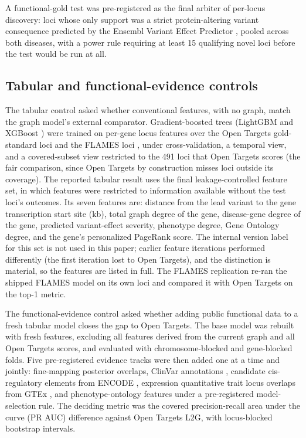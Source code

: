 \documentclass[11pt]{article}
\begin{document}
A functional-gold test was pre-registered as the final arbiter of per-locus discovery: loci whose only support was a strict protein-altering variant consequence predicted by the Ensembl Variant Effect Predictor \cite{mclaren2016}, pooled across both diseases, with a power rule requiring at least 15 qualifying novel loci before the test would be run at all.

\subsection{Tabular and functional-evidence controls}

The tabular control asked whether conventional features, with no graph, match the graph model's external comparator. Gradient-boosted trees (LightGBM \cite{ke2017} and XGBoost \cite{chen2016}) were trained on per-gene locus features over the Open Targets gold-standard loci and the FLAMES loci \cite{schipper2025}, under cross-validation, a temporal view, and a covered-subset view restricted to the 491 loci that Open Targets scores (the fair comparison, since Open Targets by construction misses loci outside its coverage). The reported tabular result uses the final leakage-controlled feature set, in which features were restricted to information available without the test loci's outcomes. Its seven features are: distance from the lead variant to the gene transcription start site (kb), total graph degree of the gene, disease-gene degree of the gene, predicted variant-effect severity, phenotype degree, Gene Ontology degree, and the gene's personalized PageRank score. The internal version label for this set is not used in this paper; earlier feature iterations performed differently (the first iteration lost to Open Targets), and the distinction is material, so the features are listed in full. The FLAMES replication re-ran the shipped FLAMES model on its own loci and compared it with Open Targets on the top-1 metric.

The functional-evidence control asked whether adding public functional data to a fresh tabular model closes the gap to Open Targets. The base model was rebuilt with fresh features, excluding all features derived from the current graph and all Open Targets scores, and evaluated with chromosome-blocked and gene-blocked folds. Five pre-registered evidence tracks were then added one at a time and jointly: fine-mapping posterior overlaps, ClinVar annotations \cite{landrum2018}, candidate cis-regulatory elements from ENCODE \cite{encode2020}, expression quantitative trait locus overlaps from GTEx \cite{gtex2020}, and phenotype-ontology features under a pre-registered model-selection rule. The deciding metric was the covered precision-recall area under the curve (PR AUC) difference against Open Targets L2G, with locus-blocked bootstrap intervals.
\end{document}

